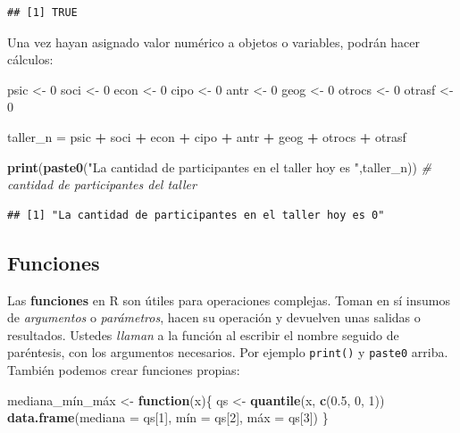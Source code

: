 \documentclass[
]{article}
\newenvironment{Shaded}{\begin{snugshade}}{\end{snugshade}}
\newcommand{\AttributeTok}[1]{\textcolor[rgb]{0.13,0.29,0.53}{#1}}
\newcommand{\CommentTok}[1]{\textcolor[rgb]{0.56,0.35,0.01}{\textit{#1}}}
\newcommand{\ControlFlowTok}[1]{\textcolor[rgb]{0.13,0.29,0.53}{\textbf{#1}}}
\newcommand{\DecValTok}[1]{\textcolor[rgb]{0.00,0.00,0.81}{#1}}
\newcommand{\FloatTok}[1]{\textcolor[rgb]{0.00,0.00,0.81}{#1}}
\newcommand{\FunctionTok}[1]{\textcolor[rgb]{0.13,0.29,0.53}{\textbf{#1}}}
\newcommand{\NormalTok}[1]{#1}
\newcommand{\OtherTok}[1]{\textcolor[rgb]{0.56,0.35,0.01}{#1}}
\newcommand{\SpecialCharTok}[1]{\textcolor[rgb]{0.81,0.36,0.00}{\textbf{#1}}}
\newcommand{\StringTok}[1]{\textcolor[rgb]{0.31,0.60,0.02}{#1}}
\begin{document}
\begin{verbatim}
## [1] TRUE
\end{verbatim}

Una vez hayan asignado valor numérico a objetos o variables, podrán
hacer cálculos:

\begin{Shaded}
\begin{Highlighting}[]
\NormalTok{psic }\OtherTok{\textless{}{-}} \DecValTok{0}
\NormalTok{soci }\OtherTok{\textless{}{-}} \DecValTok{0}
\NormalTok{econ }\OtherTok{\textless{}{-}} \DecValTok{0}
\NormalTok{cipo }\OtherTok{\textless{}{-}} \DecValTok{0}
\NormalTok{antr }\OtherTok{\textless{}{-}} \DecValTok{0}
\NormalTok{geog }\OtherTok{\textless{}{-}} \DecValTok{0}
\NormalTok{otrocs }\OtherTok{\textless{}{-}} \DecValTok{0}
\NormalTok{otrasf }\OtherTok{\textless{}{-}} \DecValTok{0}

\NormalTok{taller\_n }\OtherTok{=}\NormalTok{ psic }\SpecialCharTok{+}\NormalTok{ soci }\SpecialCharTok{+}\NormalTok{ econ }\SpecialCharTok{+}\NormalTok{ cipo }\SpecialCharTok{+}\NormalTok{ antr }\SpecialCharTok{+}\NormalTok{ geog }\SpecialCharTok{+}\NormalTok{ otrocs }\SpecialCharTok{+}\NormalTok{ otrasf}

\FunctionTok{print}\NormalTok{(}\FunctionTok{paste0}\NormalTok{(}\StringTok{"La cantidad de participantes en el taller hoy es "}\NormalTok{,taller\_n)) }\CommentTok{\# cantidad de participantes del taller}
\end{Highlighting}
\end{Shaded}

\begin{verbatim}
## [1] "La cantidad de participantes en el taller hoy es 0"
\end{verbatim}

\subsection{Funciones}\label{funciones}

Las \textbf{funciones} en R son útiles para operaciones complejas. Toman
en sí insumos de \emph{argumentos} o \emph{parámetros}, hacen su
operación y devuelven unas salidas o resultados. Ustedes \emph{llaman} a
la función al escribir el nombre seguido de paréntesis, con los
argumentos necesarios. Por ejemplo \texttt{print()} y \texttt{paste0}
arriba. También podemos crear funciones propias:

\begin{Shaded}
\begin{Highlighting}[]
\NormalTok{mediana\_mín\_máx }\OtherTok{\textless{}{-}} \ControlFlowTok{function}\NormalTok{(x)\{}
\NormalTok{  qs }\OtherTok{\textless{}{-}} \FunctionTok{quantile}\NormalTok{(x, }\FunctionTok{c}\NormalTok{(}\FloatTok{0.5}\NormalTok{, }\DecValTok{0}\NormalTok{, }\DecValTok{1}\NormalTok{))}
  \FunctionTok{data.frame}\NormalTok{(}\AttributeTok{mediana =}\NormalTok{ qs[}\DecValTok{1}\NormalTok{], mín }\OtherTok{=}\NormalTok{ qs[}\DecValTok{2}\NormalTok{], máx }\OtherTok{=}\NormalTok{ qs[}\DecValTok{3}\NormalTok{])}
\NormalTok{\}}
\end{Highlighting}
\end{Shaded}
\end{document}

